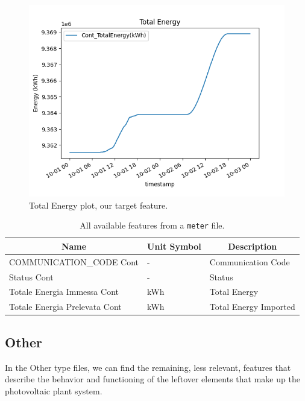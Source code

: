 \begin{figure}[H]
	\centering
	\includegraphics[width=1\linewidth]{chapters/1_introduction/imgs/totalenergy.png}
	\caption{Total Energy plot, our target feature.}
	\label{fig:totenergyplot}
\end{figure}

\begin{table}[H]
	\begin{center}
		\begin{tabular}[c]{l|l|l}
			\multicolumn{1}{c|}{\textbf{Name}}        &
			\multicolumn{1}{c|}{\textbf{Unit Symbol}} &
			\multicolumn{1}{c}{\textbf{Description}}                                \\
			\hline
			COMMUNICATION\_CODE Cont                  & -   & Communication Code    \\
			Status Cont                               & -   & Status                \\
			Totale Energia Immessa Cont               & kWh & Total Energy          \\
			Totale Energia Prelevata Cont             & kWh & Total Energy Imported \\
		\end{tabular}
		\caption{All available features from a \texttt{meter} file.}\label{tab:meterfeatures}
	\end{center}
\end{table}

\subsection{Other}
In the Other type files, we can find the remaining,
less relevant, features
that describe the behavior and functioning of the leftover elements
that make up the photovoltaic plant system.


